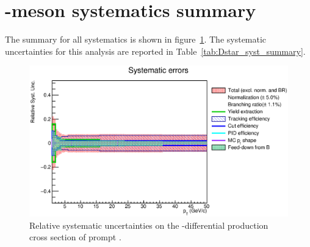 \section{\Dstar -meson systematics summary}

The summary for all systematics is shown in figure~\ref{fig:DstarSystSum}. The systematic uncertainties for this analysis are reported in Table~\ref{tab:Dstar_syst_summary}.


\begin{figure}[tb]
\begin{center}
 \includegraphics[width=1\textwidth]{figures/Dstar/pp13TeV/RelativeSystematics.eps}
\caption{Relative systematic uncertainties on the \pt -differential production cross section of prompt \Dstar.}
\label{fig:DstarSystSum}
\end{center}
\end{figure}


